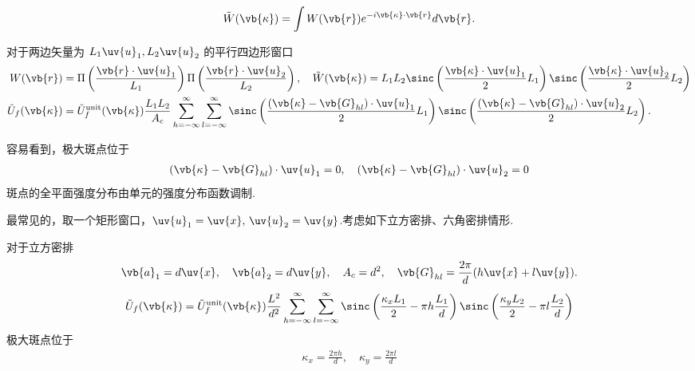 \begin{align*}
	\tilde{W}(\vb{\kappa}) = \int W(\vb{r}) e^{-i \vb{\kappa} \cdot \vb{r}} d\vb{r}.
\end{align*}

对于两边矢量为 \(L_1 \uv{u}_1, L_2 \uv{u}_2\) 的平行四边形窗口
\begin{align*}
	W(\vb{r}) &= \Pi\left( \frac{\vb{r} \cdot \uv{u}_1}{L_1} \right) \Pi\left( \frac{\vb{r} \cdot \uv{u}_2}{L_2} \right), \quad \tilde{W}(\vb{\kappa}) = L_1 L_2 \sinc\left( \frac{\vb{\kappa} \cdot \uv{u}_1}{2} L_1 \right) \sinc\left( \frac{\vb{\kappa} \cdot \uv{u}_2}{2} L_2 \right)\\
	\tilde{U}_f(\vb{\kappa}) &= \tilde{U}_f^{\text{unit}}(\vb{\kappa}) \frac{L_1 L_2}{A_c} \sum_{h=-\infty}^{\infty} \sum_{l=-\infty}^{\infty} \sinc\left( \frac{(\vb{\kappa} - \vb{G}_{hl}) \cdot \uv{u}_1}{2} L_1 \right) \sinc\left( \frac{(\vb{\kappa} - \vb{G}_{hl}) \cdot \uv{u}_2}{2} L_2 \right).
\end{align*}

容易看到，极大斑点位于
\begin{align*}
	(\vb{\kappa} - \vb{G}_{hl}) \cdot \uv{u}_1=0,\quad (\vb{\kappa} - \vb{G}_{hl}) \cdot \uv{u}_2=0
\end{align*}
斑点的全平面强度分布由单元的强度分布函数调制.

最常见的，取一个矩形窗口，\(\uv{u}_1=\uv{x},\,\uv{u}_2=\uv{y}\).考虑如下立方密排、六角密排情形.

\begin{exbox}
	对于立方密排
	\begin{align*}
		\vb{a}_1 = d \uv{x}, \quad \vb{a}_2 = d \uv{y}, \quad A_c = d^2, \quad \vb{G}_{hl} = \frac{2\pi}{d} (h \uv{x} + l \uv{y}).
	\end{align*}
	\begin{align*}
		\tilde{U}_f(\vb{\kappa}) = \tilde{U}_f^{\text{unit}}(\vb{\kappa}) \frac{L^2}{d^2} \sum_{h=-\infty}^{\infty} \sum_{l=-\infty}^{\infty} \sinc\left( \frac{\kappa_x L_1}{2} - \pi h \frac{L_1}{d} \right) \sinc\left( \frac{\kappa_y L_2}{2} - \pi l \frac{L_2}{d} \right)
	\end{align*}
	极大斑点位于
	\begin{align*}
		\kappa_x=\frac{2\pi h}{d},\quad \kappa_y=\frac{2\pi l}{d}
	\end{align*}
\end{exbox}

